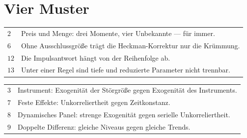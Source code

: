 \section{Vier Muster}

\begin{merksatz}
\begin{center}
{\small
\renewcommand{\arraystretch}{1.48}
\begin{tabular}{@{}P{1.4cm}P{7.0cm}@{}}
\toprule
$2$ & Preis und Menge: drei Momente, vier Unbekannte --- für immer.\\
$6$ & Ohne Ausschlussgröße trägt die Heckman-Korrektur nur die Krümmung.\\
$12$ & Die Impulsantwort hängt von der Reihenfolge ab.\\
$13$ & Unter einer Regel sind tiefe und reduzierte Parameter nicht trennbar.\\
\bottomrule
\end{tabular}}
\end{center}

\begin{center}
\begin{minipage}{0.88\textwidth}
\end{minipage}
\end{center}
\end{merksatz}

\begin{merksatz}
\begin{center}
{\small
\renewcommand{\arraystretch}{1.48}
\begin{tabular}{@{}P{1.4cm}P{7.0cm}@{}}
\toprule
$3$ & Instrument: Exogenität der Störgröße gegen Exogenität des Instruments.\\
$7$ & Feste Effekte: Unkorreliertheit gegen Zeitkonstanz.\\
$8$ & Dynamisches Panel: strenge Exogenität gegen serielle Unkorreliertheit.\\
$9$ & Doppelte Differenz: gleiche Niveaus gegen gleiche Trends.\\
\bottomrule
\end{tabular}}
\end{center}

\begin{center}
\begin{minipage}{0.88\textwidth}
\end{minipage}
\end{center}
\end{merksatz}


